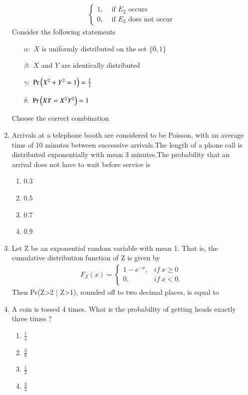 \documentclass[journal,12pt,twocolumn]{IEEEtran}
\begin{document}
\begin{enumerate}
\begin{align}
\begin{cases}
1, &\text{ if $E_2$ occurs}\\
0, &\text{ if $E_2$ does not occur}
\end{cases}
\end{align}
Consider the following statements
\begin{itemize}
    \item[$\alpha:$]$X$ is uniformly distributed on the set $\{0,1\}$
    \item[$\beta:$]$X$ and $Y$ are identically distributed
    \item[$\gamma:$]$\Pr\left(X^2 + Y^2 = 1\right) = \frac{1}{2}$
    \item[$\delta:$]$\Pr\left(XY=X^2Y^2\right) = 1$
\end{itemize}
Choose the correct combination
\begin{enumerate}[label = (\alph*)]
\end{enumerate}
%
\solution

%
\item Arrivals at a telephone booth are considered to be Poisson, with an average time of 10 minutes between successive arrivals.The length of a phone call is distributed exponentially with mean 3 minutes.The probability that an arrival does not have to wait before service is
\begin{enumerate}
    \item{0.3}
    \item{0.5}
    \item{0.7}
    \item{0.9}
\end{enumerate}
%
\solution

%
\item  Let Z be an exponential random variable with mean 1. That is, the cumulative distribution function of Z is given by 
\begin{align}
    F_Z(x) =
    \begin{cases}
    1 - {e^{-x}}, & if\ x \ge 0\\
    0, & if\ x<0.
    \end{cases}
\end{align}
Then Pr{(Z>2 | Z>1)}, rounded off to two decimal places, is equal to 
%
\solution

%
\item A coin is tossed 4 times. What is the probability of getting heads exactly three times ?
\begin{enumerate}
    \item $\frac{1}{4}$ 
    \item $\frac{3}{8}$
    \item $\frac{1}{2}$
    \item $\frac{3}{4}$
    

\end{enumerate}
\end{enumerate}
\end{document}
